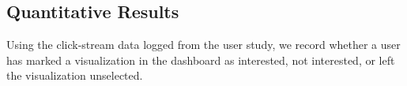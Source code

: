 \subsection{Quantitative Results}
 Using the click-stream data logged from the user study, we record whether a user has marked a visualization in the dashboard as interested, not interested, or left the visualization unselected. %

